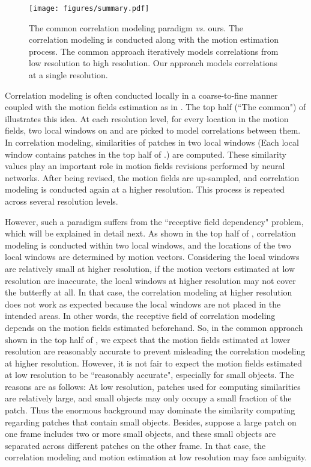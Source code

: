 \documentclass{article}
\begin{document}
\begin{figure}[tbp]
    \centering
    \texttt{[image: figures/summary.pdf]}
    \caption{The common correlation modeling paradigm \textit{vs.} ours. The correlation modeling is conducted along with the motion estimation process. The common approach iteratively models correlations from low resolution to high resolution. Our approach models correlations at a single resolution. } 
    \label{fig:summary}
\end{figure}

Correlation modeling is often conducted locally in a coarse-to-fine manner coupled with the motion fields estimation as in \cite{bmbc,abme,vfiformer}. The top half (``The common") of  illustrates this idea. At each resolution level, for every location in the motion fields, two local windows on  and  are picked to model correlations between them. In correlation modeling, similarities of patches in two local windows (Each local window contains  patches in the top half of .) are computed. These similarity values play an important role in motion fields revisions performed by neural networks. After being revised, the motion fields are up-sampled, and correlation modeling is conducted again at a higher resolution. This process is repeated across several resolution levels.

However, such a paradigm suffers from the ``receptive field dependency" problem, which will be explained in detail next. As shown in the top half of  , correlation modeling is conducted within two local windows, and the locations of the two local windows are determined by motion vectors. Considering the local windows are relatively small at higher resolution, if the motion vectors estimated at low resolution are inaccurate, the local windows at higher resolution may not cover the butterfly at all. In that case, the correlation modeling at higher resolution does not work as expected because the local windows are not placed in the intended areas. In other words, the receptive field of correlation modeling depends on the motion fields estimated beforehand. So, in the common approach shown in the top half of , we expect that the motion fields estimated at lower resolution are reasonably accurate to prevent misleading the correlation modeling at higher resolution. However, it is not fair to expect the motion fields estimated at low resolution to be ``reasonably accurate", especially for small objects. The reasons are as follows: At low resolution, patches used for computing similarities are relatively large, and small objects may only occupy a small fraction of the patch. Thus the enormous background may dominate the similarity computing regarding patches that contain small objects. Besides, suppose a large patch on one frame includes two or more small objects, and these small objects are separated across different patches on the other frame. In that case, the correlation modeling and motion estimation at low resolution may face ambiguity.
\end{document}

